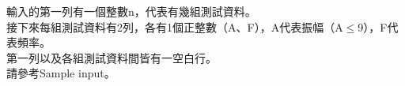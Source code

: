 輸入的第一列有一個整數n，代表有幾組測試資料。\\
接下來每組測試資料有2列，各有1個正整數（A、F），A代表振幅（A$\leq$9），F代表頻率。\\
  第一列以及各組測試資料間皆有一空白行。\\
請參考Sample input。\\
